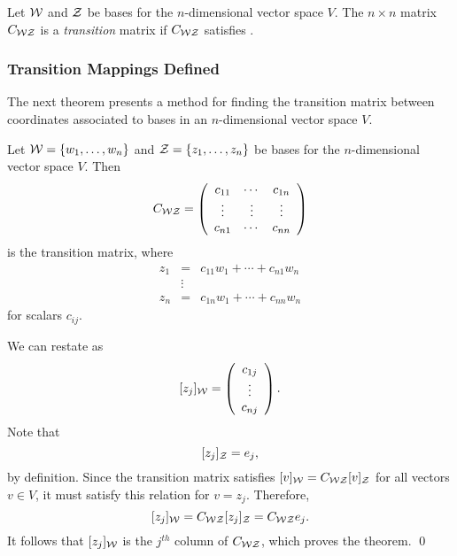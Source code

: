 \begin{Def}
Let ${\cal W}$ and ${\cal Z}$ be bases for the $n$-dimensional
vector space $V$.  The $n\times n$ matrix $C_{{\cal W}{\cal Z}}$
is a {\em transition\/} matrix if $C_{{\cal W}{\cal Z}}$ satisfies
.
\end{Def}  


\subsubsection*{Transition Mappings Defined}

The next theorem presents a method for finding the transition matrix
between coordinates associated to bases in an $n$-dimensional vector
space $V$.

\begin{thm}  \label{T:coordform}
Let ${\cal W}=\{w_1,\ldots,w_n\}$ and ${\cal Z}=\{z_1,\ldots,z_n\}$
be bases for the $n$-dimensional vector space $V$.
Then
\begin{equation} \label{e:coordform}
C_{{\cal W}{\cal Z}} =
\left(\begin{array}{ccc} c_{11} & \cdots & c_{1n} \\
\vdots & \vdots & \vdots \\
c_{n1} & \cdots & c_{nn} \end{array}\right)
\end{equation}
is the transition matrix, where
\begin{equation} \label{e:wtoz}
\begin{array}{ccc}
z_1 & = & c_{11}w_1 + \cdots + c_{n1}w_n \nonumber \\
    & \vdots &  \\
z_n & = & c_{1n}w_1 + \cdots + c_{nn}w_n \nonumber
\end{array}
\end{equation}
for scalars $c_{ij}$.
\end{thm}

\proof
We can restate  as
\[
[z_j]_{\cal W} = \left(\begin{array}{c} c_{1j} \\ \vdots \\c_{nj}
\end{array} \right).
\]
Note that
\[
[z_j]_{\cal Z} = e_j,
\]
by definition.  Since the transition matrix satisfies
$[v]_{\cal W} =  C_{{\cal W}{\cal Z}}[v]_{\cal Z}$ for all vectors
$v\in V$, it must satisfy this relation for $v=z_j$.  Therefore,
\[
[z_j]_{\cal W} = C_{{\cal W}{\cal Z}}[z_j]_{\cal Z} = C_{{\cal W}{\cal Z}}e_j.
\]
It follows that $[z_j]_{\cal W}$ is the $j^{th}$ column of
$C_{{\cal W}{\cal Z}}$, which proves the theorem.  \qed

